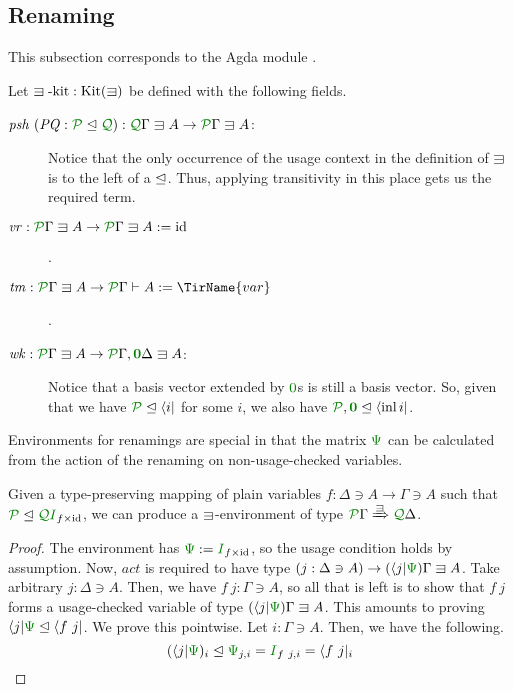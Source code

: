 \documentclass[submission,copyright,creativecommons]{eptcs}
\begin{document}
\subsection{Renaming}

This subsection corresponds to the Agda module
.

\begin{definition}\label{def:lvar-kit}
  Let $\lvar\textrm{-kit} : \kit(\lvar)$ be defined with the following
  fields.
  \begin{description}
    \item[$\mathit{psh}~(\mathit{PQ} : \resctx P \subres \resctx Q)
      : \ctx{\Gamma}{Q} \lvar A \to \ctx{\Gamma}{P} \lvar A$:]
      Notice that the only occurrence of the usage context in the definition of
      $\lvar$ is to the left of a $\trianglelefteq$.
      Thus, applying transitivity in this place gets us the required term.
    \item[$\mathit{vr} : \ctx{\Gamma}{P} \lvar A \to \ctx{\Gamma}{P} \lvar A
      := \mathrm{id}$].
    \item[$\mathit{tm} : \ctx{\Gamma}{P} \lvar A \to \ctx{\Gamma}{P} \vdash A
      := \TirName{var}$].
    \item[$\mathit{wk} : \ctx{\Gamma}{P} \lvar A
      \to \ctx{\Gamma}{P}, \ctx{\Delta}{\vct 0} \lvar A$:]
      Notice that a basis vector extended by $\rescomment 0$s is still a basis
      vector.
      So, given that we have $\resctx P \subres \langle i \rvert$ for some $i$,
      we also have
      $\resctx P, \rescomment{\vct 0} \subres \langle \inl i \rvert$.
  \end{description}
\end{definition}

Environments for renamings are special in that the matrix $\rescomment\Psi$ can
be calculated from the action of the renaming on non-usage-checked variables.

\begin{lemma}\label{lem:ren-env}
  Given a type-preserving mapping of plain variables
  $f : \Delta \ni A \to \Gamma \ni A$ such that
  $\resctx P \subres \resctx Q\rescomment I_{f\times\id}$,
  we can produce a $\lvar$-environment of type
  $\ctx{\Gamma}{P} \subst{\lvar} \ctx{\Delta}{Q}$.
\end{lemma}
\begin{proof}
  The environment has $\rescomment\Psi := \rescomment I_{f\times\id}$,
  so the usage condition holds by assumption.
  Now, $\mathit{act}$ is required to have type
  $(j : \Delta \ni A) \to (\langle j \rvert\rescomment\Psi)\Gamma \lvar A$.
  Take arbitrary $j : \Delta \ni A$.
  Then, we have $f~j : \Gamma \ni A$, so all that is left is to show that $f~j$
  forms a usage-checked variable of type
  $(\langle j \rvert\rescomment\Psi)\Gamma \lvar A$.
  This amounts to proving
  $\langle j \rvert\rescomment\Psi \subres \langle f~j \rvert$.
  We prove this pointwise.
  Let $i : \Gamma \ni A$.
  Then, we have the following.
  \[
    (\langle j \rvert\rescomment\Psi)_i
    \subres \rescomment\Psi_{j,i}
    = \rescomment I_{f~j,i}
    = \langle f~j \rvert_i
  \]
\end{proof}
\end{document}
